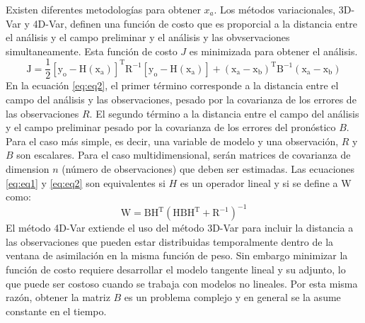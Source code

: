 \documentclass[12pt,twoside]{reedthesis}
\begin{document}
Existen diferentes metodologías para obtener \(x_a\). Los métodos variacionales, 3D-Var y 4D-Var, definen una función de costo que es proporcial a la distancia entre el análisis y el campo preliminar y el análisis y las obvservaciones simultaneamente. Esta función de costo \(J\) es minimizada para obtener el análisis.
\begin{equation}
  \mathrm{J = \frac{1}{2} {[y_o - H (x_a)]^T R^{-1} [y_o - H (x_a)] + (x_a - x_b )^T B^{-1} (x_a - x_b )}}
  \label{eq:eq2}
\end{equation}
En la ecuación \eqref{eq:eq2}, el primer término corresponde a la distancia entre el campo del análisis y las observaciones, pesado por la covarianza de los errores de las observaciones \(R\). El segundo término a la distancia entre el campo del análisis y el campo preliminar pesado por la covarianza de los errores del pronóstico \(B\). Para el caso más simple, es decir, una variable de modelo y una observación, \(R\) y \(B\) son escalares. Para el caso multidimensional, serán matrices de covarianza de dimension \(n\) (número de observaciones) que deben ser estimadas. Las ecuaciones \eqref{eq:eq1} y \eqref{eq:eq2} son equivalentes si \(H\) es un operador lineal y si se define a W como:
\begin{equation}
  \mathrm{W = BH^T (HBH^T + R^{-1})^{-1}}
  \label{eq:eq3}
\end{equation}
El método 4D-Var extiende el uso del método 3D-Var para incluir la distancia a las observaciones que pueden estar distribuidas temporalmente dentro de la ventana de asimilación en la misma función de peso. Sin embargo minimizar la función de costo requiere desarrollar el modelo tangente lineal y su adjunto, lo que puede ser costoso cuando se trabaja con modelos no lineales. Por esta misma razón, obtener la matriz \(B\) es un problema complejo y en general se la asume constante en el tiempo.
\end{document}
